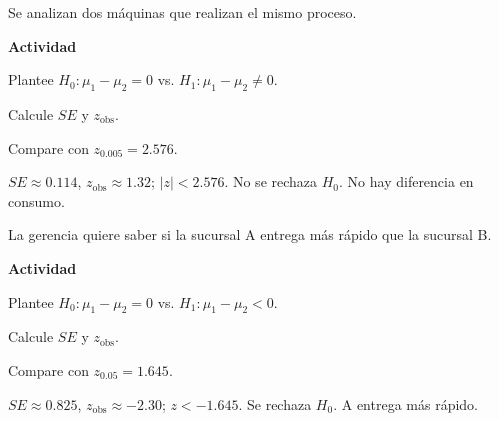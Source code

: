 \begin{ejercicio}
Se analizan dos máquinas que realizan el mismo proceso.


\textbf{Actividad}
\begin{pasos}
  \item Plantee $H_0:\mu_1-\mu_2=0$ vs. $H_1:\mu_1-\mu_2\neq 0$.
  \item Calcule $SE$ y $z_{\text{obs}}$.
  \item Compare con $z_{0.005}=2.576$.
\end{pasos}

\begin{clave}
$SE\approx 0.114$, $z_{\text{obs}}\approx 1.32$; $|z|<2.576$.
No se rechaza $H_0$. No hay diferencia en consumo.
\end{clave}
\end{ejercicio}

\begin{ejercicio}
La gerencia quiere saber si la sucursal A entrega más rápido que la sucursal B.


\textbf{Actividad}
\begin{pasos}
  \item Plantee $H_0:\mu_1-\mu_2=0$ vs. $H_1:\mu_1-\mu_2<0$.
  \item Calcule $SE$ y $z_{\text{obs}}$.
  \item Compare con $z_{0.05}=1.645$.
\end{pasos}

\begin{clave}
$SE\approx 0.825$, $z_{\text{obs}}\approx -2.30$; $z<-1.645$.
Se rechaza $H_0$. A entrega más rápido.
\end{clave}
\end{ejercicio}


